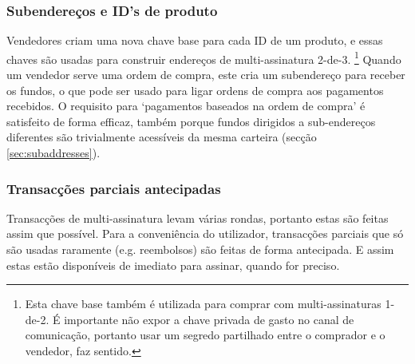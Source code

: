 \subsubsection*{Subendereços e ID's de produto}

Vendedores criam uma nova chave base para cada ID de um produto, e essas chaves são usadas para construir endereços de multi-assinatura 2-de-3. 
\footnote{Esta chave base também é utilizada para comprar com multi-assinaturas 1-de-2. É importante não expor a chave privada de gasto no canal de comunicação, portanto usar um segredo partilhado entre o comprador e o vendedor, faz sentido.} 
Quando um vendedor serve uma ordem de compra, este cria um subendereço para receber os fundos, o que pode ser usado para ligar ordens de compra aos pagamentos recebidos. 
O requisito para `pagamentos baseados na ordem de compra' é satisfeito de forma efficaz, também porque fundos dirigidos a sub-endereços diferentes são trivialmente acessíveis da mesma carteira (secção \ref{sec:subaddresses}).

\subsubsection*{Transacções parciais antecipadas}

Transacções de multi-assinatura levam várias rondas, portanto estas são feitas assim que possível. Para a conveniência do utilizador, transacções parciais que só são usadas raramente (e.g. reembolsos) são feitas de forma antecipada. E assim estas estão disponíveis de imediato para assinar, quando for preciso.  

